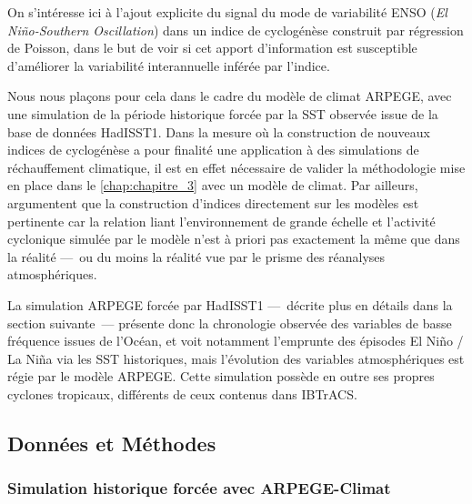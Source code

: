 \documentclass[../main.tex]{subfiles}
\begin{document}
On s'intéresse ici à l'ajout explicite du signal du mode de variabilité ENSO (\textit{El Niño-Southern Oscillation}) dans un indice de cyclogénèse construit par
régression de Poisson, dans le but de voir si cet apport d'information est susceptible d'améliorer la variabilité interannuelle inférée par l'indice.

Nous nous plaçons pour cela dans le cadre du modèle de climat ARPEGE, avec une simulation de la période historique forcée par la SST observée issue de la base
de données HadISST1. Dans la mesure où la construction de nouveaux indices de cyclogénèse a pour finalité une application à des simulations de réchauffement
climatique, il est en effet nécessaire de valider la méthodologie mise en place dans le \cref{chap:chapitre_3} avec un modèle de climat. Par ailleurs,
\textcite{camargo_testing_2014} argumentent que la construction d'indices directement sur les modèles est pertinente car la relation liant l'environnement de
grande échelle et l'activité cyclonique simulée par le modèle n'est à priori pas exactement la même que dans la réalité ---~ou du moins la réalité vue par le
prisme des réanalyses atmosphériques.

La simulation ARPEGE forcée par HadISST1 ---~décrite plus en détails dans la section suivante~--- présente donc la chronologie observée des variables de basse
fréquence issues de l'Océan, et voit notamment l'emprunte des épisodes El Niño / La Niña via les SST historiques, mais l'évolution des variables atmosphériques est
régie par le modèle ARPEGE. Cette simulation possède en outre ses propres cyclones tropicaux, différents de ceux contenus dans IBTrACS.

\subsection{Données et Méthodes}

\subsubsection{Simulation historique forcée avec ARPEGE-Climat}
\end{document}
